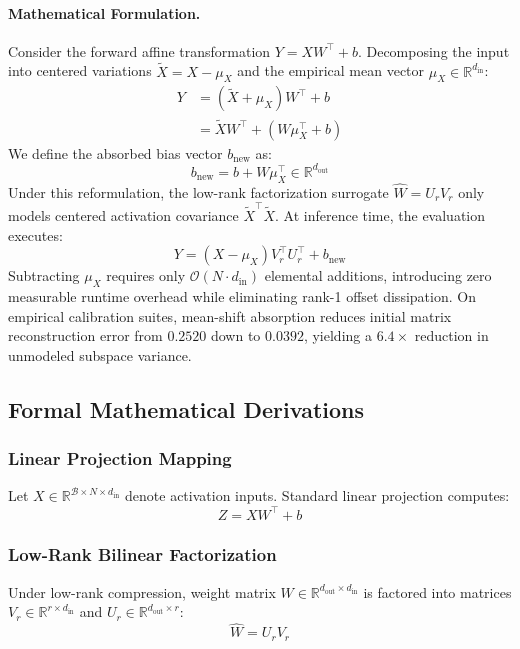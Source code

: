 \documentclass{article}
\begin{document}
\paragraph{Mathematical Formulation.}
Consider the forward affine transformation $Y = X W^\top + b$. Decomposing the input into centered variations $\tilde{X} = X - \mu_X$ and the empirical mean vector $\mu_X \in \mathbb{R}^{d_{\text{in}}}$:
\begin{align}
Y &= (\tilde{X} + \mu_X) W^\top + b \\
  &= \tilde{X} W^\top + (W \mu_X^\top + b)
\end{align}
We define the absorbed bias vector $b_{\text{new}}$ as:
\begin{equation}
b_{\text{new}} = b + W \mu_X^\top \in \mathbb{R}^{d_{\text{out}}}
\end{equation}
Under this reformulation, the low-rank factorization surrogate $\hat{W} = U_r V_r$ only models centered activation covariance $\tilde{X}^\top \tilde{X}$. At inference time, the evaluation executes:
\begin{equation}
Y = (X - \mu_X) V_r^\top U_r^\top + b_{\text{new}}
\end{equation}
Subtracting $\mu_X$ requires only $\mathcal{O}(N \cdot d_{\text{in}})$ elemental additions, introducing zero measurable runtime overhead while eliminating rank-1 offset dissipation. On empirical calibration suites, mean-shift absorption reduces initial matrix reconstruction error from $0.2520$ down to $0.0392$, yielding a $6.4\times$ reduction in unmodeled subspace variance.

\subsection{Formal Mathematical Derivations}

\subsubsection{Linear Projection Mapping}
Let $X \in \mathbb{R}^{\mathcal{B} \times N \times d_{\text{in}}}$ denote activation inputs. Standard linear projection computes:
\[
Z = X W^\top + b
\]

\subsubsection{Low-Rank Bilinear Factorization}
Under low-rank compression, weight matrix $W \in \mathbb{R}^{d_{\text{out}} \times d_{\text{in}}}$ is factored into matrices $V_r \in \mathbb{R}^{r \times d_{\text{in}}}$ and $U_r \in \mathbb{R}^{d_{\text{out}} \times r}$:
\[
\hat{W} = U_r V_r
\]
\end{document}
